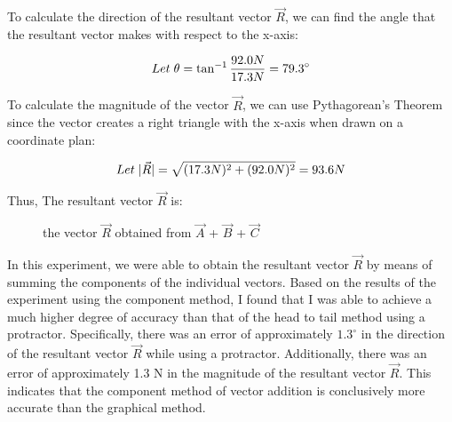 \documentclass[12pt]{article}
\begin{document}
\bigskip

To calculate the direction of the resultant vector $\vec{R}$, we can find the angle that the resultant vector makes with respect to the x-axis:

\[Let \thickspace \theta = \tan^{-1}\frac{92.0N}{17.3N} = 79.3^\circ\]

To calculate the magnitude of the vector $\vec{R}$, we can use Pythagorean's Theorem since the vector creates a right triangle with the x-axis when drawn on a coordinate plan:

\[Let \thickspace |\vec{R}|= \sqrt{(17.3N)^2 + (92.0N)^2}=93.6N\]

\bigskip

Thus, The resultant vector $\vec{R}$ is:

\begin{figure}[H]
    \centering

    \caption{the vector $\vec{R}$ obtained from $\vec{A}$ + $\vec{B}$ + $\vec{C}$}



\end{figure}

In this experiment, we were able to obtain the resultant vector $\vec{R}$ by means of summing the components of the individual vectors. Based on the results of the experiment using the component method, I found that I was able to achieve a much higher degree of accuracy than that of the head to tail method using a protractor. Specifically, there was an error of approximately $1.3^\circ$ in the direction of the resultant vector $\vec{R}$ while using a protractor. Additionally, there was an error of approximately 1.3 N in the magnitude of the resultant vector $\vec{R}$. This indicates that the component method of vector addition is conclusively more accurate than the graphical method.
\end{document}
